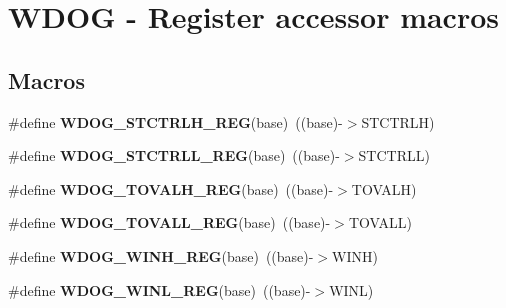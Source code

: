 \hypertarget{group__WDOG__Register__Accessor__Macros}{}\section{W\+D\+OG -\/ Register accessor macros}
\label{group__WDOG__Register__Accessor__Macros}
\subsection*{Macros}
\begin{DoxyCompactItemize}
\item 
\#define {\bfseries W\+D\+O\+G\+\_\+\+S\+T\+C\+T\+R\+L\+H\+\_\+\+R\+EG}(base)~((base)-\/$>$S\+T\+C\+T\+R\+LH)\hypertarget{group__WDOG__Register__Accessor__Macros_ga1f87578559ffa9508f29e7a8b5f852f0}{}\label{group__WDOG__Register__Accessor__Macros_ga1f87578559ffa9508f29e7a8b5f852f0}

\item 
\#define {\bfseries W\+D\+O\+G\+\_\+\+S\+T\+C\+T\+R\+L\+L\+\_\+\+R\+EG}(base)~((base)-\/$>$S\+T\+C\+T\+R\+LL)\hypertarget{group__WDOG__Register__Accessor__Macros_ga9390a99165a8ed47a8d47310dd1b7a44}{}\label{group__WDOG__Register__Accessor__Macros_ga9390a99165a8ed47a8d47310dd1b7a44}

\item 
\#define {\bfseries W\+D\+O\+G\+\_\+\+T\+O\+V\+A\+L\+H\+\_\+\+R\+EG}(base)~((base)-\/$>$T\+O\+V\+A\+LH)\hypertarget{group__WDOG__Register__Accessor__Macros_ga3495178bd50541f858403de84b2132df}{}\label{group__WDOG__Register__Accessor__Macros_ga3495178bd50541f858403de84b2132df}

\item 
\#define {\bfseries W\+D\+O\+G\+\_\+\+T\+O\+V\+A\+L\+L\+\_\+\+R\+EG}(base)~((base)-\/$>$T\+O\+V\+A\+LL)\hypertarget{group__WDOG__Register__Accessor__Macros_ga5867725d00829838e63aa304cd8e571e}{}\label{group__WDOG__Register__Accessor__Macros_ga5867725d00829838e63aa304cd8e571e}

\item 
\#define {\bfseries W\+D\+O\+G\+\_\+\+W\+I\+N\+H\+\_\+\+R\+EG}(base)~((base)-\/$>$W\+I\+NH)\hypertarget{group__WDOG__Register__Accessor__Macros_ga044a2078fb0f549de3bd68c329f4defb}{}\label{group__WDOG__Register__Accessor__Macros_ga044a2078fb0f549de3bd68c329f4defb}

\item 
\#define {\bfseries W\+D\+O\+G\+\_\+\+W\+I\+N\+L\+\_\+\+R\+EG}(base)~((base)-\/$>$W\+I\+NL)\hypertarget{group__WDOG__Register__Accessor__Macros_ga6de8f153524881bc674e0c1bf87529f3}{}\label{group__WDOG__Register__Accessor__Macros_ga6de8f153524881bc674e0c1bf87529f3}


\end{DoxyCompactItemize}
